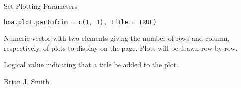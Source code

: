 \begin{Description}\relax
Set Plotting Parameters
\end{Description}
\begin{Usage}
\begin{verbatim}
boa.plot.par(mfdim = c(1, 1), title = TRUE)
\end{verbatim}
\end{Usage}
\begin{Arguments}
\begin{ldescription}
\item[\code{mfdim}] Numeric vector with two elements giving the number of rows and 
column, respectively, of plots to display on the page. Plots will be drawn 
row-by-row.
\item[\code{title}] Logical value indicating that a title be added to the plot.
\end{ldescription}
\end{Arguments}
\begin{Author}\relax
Brian J. Smith
\end{Author}

